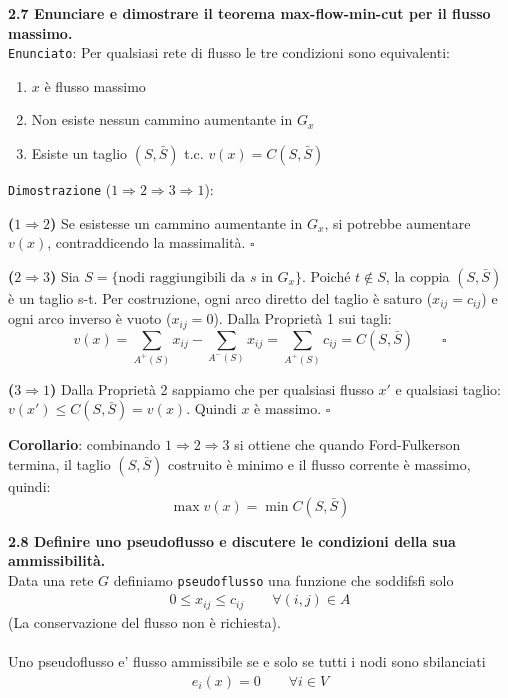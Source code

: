 \documentclass[a4paper,11pt]{article}
\newcommand{\domanda}[2]{%
  \vspace{0.6em}
  \noindent\textbf{#1}\\[0.2em]
  \noindent#2
  \vspace{1em}
  \par
}
\begin{document}
\domanda{2.7 \quad Enunciare e dimostrare il teorema max-flow-min-cut per il flusso massimo.}{
\texttt{Enunciato}: Per qualsiasi rete di flusso le tre condizioni sono equivalenti:
\begin{enumerate}
    \item $x$ è flusso massimo
    \item Non esiste nessun cammino aumentante in $G_x$
    \item Esiste un taglio $(S, \bar{S})$ t.c. $v(x) = C(S, \bar{S})$
\end{enumerate}

\texttt{Dimostrazione} ($1 \Rightarrow 2 \Rightarrow 3 \Rightarrow 1$):

\textbf{($1 \Rightarrow 2$)} Se esistesse un cammino aumentante in $G_x$,
si potrebbe aumentare $v(x)$, contraddicendo la massimalità. $\square$

\textbf{($2 \Rightarrow 3$)} Sia $S = \{\text{nodi raggiungibili da } s
\text{ in } G_x\}$. Poiché $t \notin S$, la coppia $(S, \bar{S})$ è un
taglio s-t. Per costruzione, ogni arco diretto del taglio è saturo
($x_{ij} = c_{ij}$) e ogni arco inverso è vuoto ($x_{ij} = 0$).
Dalla Proprietà 1 sui tagli:
\[
    v(x) = \sum_{A^+(S)} x_{ij} - \sum_{A^-(S)} x_{ij}
         = \sum_{A^+(S)} c_{ij} = C(S, \bar{S}) \qquad \square
\]

\textbf{($3 \Rightarrow 1$)} Dalla Proprietà 2 sappiamo che per qualsiasi
flusso $x'$ e qualsiasi taglio: $v(x') \leq C(S, \bar{S}) = v(x)$.
Quindi $x$ è massimo. $\square$

\textbf{Corollario}: combinando $1 \Rightarrow 2 \Rightarrow 3$ si ottiene
che quando Ford-Fulkerson termina, il taglio $(S, \bar{S})$ costruito è
minimo e il flusso corrente è massimo, quindi:
\[
    \max v(x) = \min C(S, \bar{S})
\]
}

\domanda{2.8 \quad Definire uno pseudoflusso e discutere le condizioni della sua ammissibilità.}{
Data una rete $G$ definiamo \texttt{pseudoflusso} una funzione che soddifsfi solo 
\begin{align*}
    0 \leq x_{ij} \leq c_{ij} \qquad \forall (i,j) \in A
\end{align*}
(La conservazione del flusso non è richiesta).\\
\vspace{1px}\\
Uno pseudoflusso e' flusso ammissibile se e solo se tutti i nodi sono sbilanciati
\begin{align*}
    e_i(x)=0 \qquad \forall i \in V
\end{align*}
}
\end{document}
